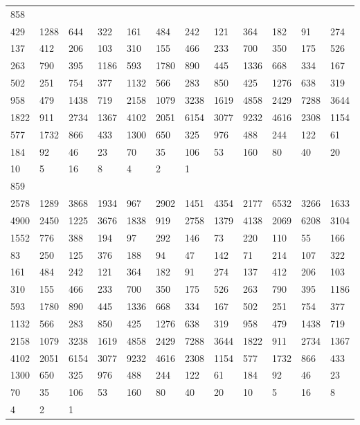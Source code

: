 \begin{longtable}{llllllllllll}
858&&&&&&&&&&&\\
429& 1288& 644& 322& 161& 484& 242& 121& 364& 182& 91& 274\\
137& 412& 206& 103& 310& 155& 466& 233& 700& 350& 175& 526\\
263& 790& 395& 1186& 593& 1780& 890& 445& 1336& 668& 334& 167\\
502& 251& 754& 377& 1132& 566& 283& 850& 425& 1276& 638& 319\\
958& 479& 1438& 719& 2158& 1079& 3238& 1619& 4858& 2429& 7288& 3644\\
1822& 911& 2734& 1367& 4102& 2051& 6154& 3077& 9232& 4616& 2308& 1154\\
577& 1732& 866& 433& 1300& 650& 325& 976& 488& 244& 122& 61\\
184& 92& 46& 23& 70& 35& 106& 53& 160& 80& 40& 20\\
10& 5& 16& 8& 4& 2& 1& \\

859&&&&&&&&&&&\\
2578& 1289& 3868& 1934& 967& 2902& 1451& 4354& 2177& 6532& 3266& 1633\\
4900& 2450& 1225& 3676& 1838& 919& 2758& 1379& 4138& 2069& 6208& 3104\\
1552& 776& 388& 194& 97& 292& 146& 73& 220& 110& 55& 166\\
83& 250& 125& 376& 188& 94& 47& 142& 71& 214& 107& 322\\
161& 484& 242& 121& 364& 182& 91& 274& 137& 412& 206& 103\\
310& 155& 466& 233& 700& 350& 175& 526& 263& 790& 395& 1186\\
593& 1780& 890& 445& 1336& 668& 334& 167& 502& 251& 754& 377\\
1132& 566& 283& 850& 425& 1276& 638& 319& 958& 479& 1438& 719\\
2158& 1079& 3238& 1619& 4858& 2429& 7288& 3644& 1822& 911& 2734& 1367\\
4102& 2051& 6154& 3077& 9232& 4616& 2308& 1154& 577& 1732& 866& 433\\
1300& 650& 325& 976& 488& 244& 122& 61& 184& 92& 46& 23\\
70& 35& 106& 53& 160& 80& 40& 20& 10& 5& 16& 8\\
4& 2& 1& \\


\end{longtable}
